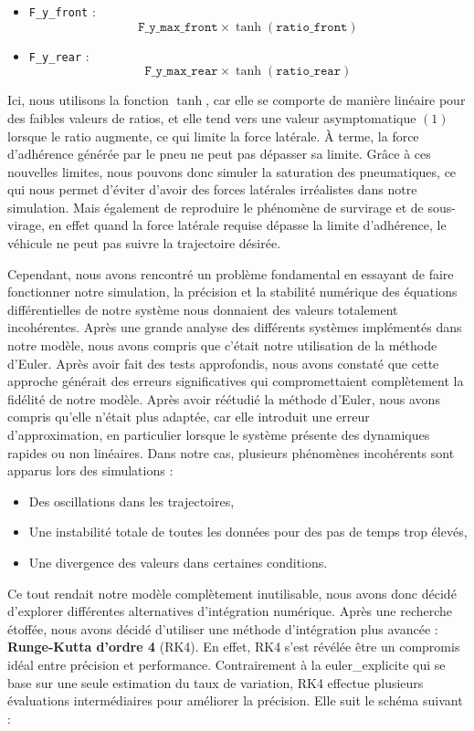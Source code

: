 \begin{itemize}
    \item \texttt{F\_y\_front} : $$\texttt{F\_y\_max\_front} \times \tanh(\texttt{ratio\_front})$$
    \item \texttt{F\_y\_rear} : $$\texttt{F\_y\_max\_rear} \times \tanh(\texttt{ratio\_rear})$$
\end{itemize}

Ici, nous utilisons la fonction $\tanh$, car elle se comporte de manière linéaire pour des faibles valeurs de ratios, et elle tend vers une valeur asymptomatique $(1)$ lorsque le ratio augmente, ce qui limite la force latérale.
À terme, la force d'adhérence générée par le pneu ne peut pas dépasser sa limite.
Grâce à ces nouvelles limites, nous pouvons donc simuler la saturation des pneumatiques, ce qui nous permet d'éviter d'avoir des forces latérales irréalistes dans notre simulation.
Mais également de reproduire le phénomène de survirage et de sous-virage, en effet quand la force latérale requise dépasse la limite d'adhérence, le véhicule ne peut pas suivre la trajectoire désirée.

Cependant, nous avons rencontré un problème fondamental en essayant de faire fonctionner notre simulation, la précision et la stabilité numérique des équations différentielles de notre système nous donnaient des valeurs totalement incohérentes.
Après une grande analyse des différents systèmes implémentés dans notre modèle, nous avons compris que c'était notre utilisation de la méthode d'Euler.
Après avoir fait des tests approfondis, nous avons constaté que cette approche générait des erreurs significatives qui compromettaient complètement la fidélité de notre modèle.
Après avoir réétudié la méthode d'Euler, nous avons compris qu'elle n'était plus adaptée, car elle introduit une erreur d'approximation, en particulier lorsque le système présente des dynamiques rapides ou non linéaires.
Dans notre cas, plusieurs phénomènes incohérents sont apparus lors des simulations :
\begin{itemize}
    \item Des oscillations dans les trajectoires,
    \item Une instabilité totale de toutes les données pour des pas de temps trop élevés,
    \item Une divergence des valeurs dans certaines conditions.
\end{itemize}
Ce tout rendait notre modèle complètement inutilisable, nous avons donc décidé d'explorer différentes alternatives d'intégration numérique.
Après une recherche étoffée, nous avons décidé d'utiliser une méthode d'intégration plus avancée : \textbf{Runge-Kutta d'ordre 4} (RK4).
En effet, RK4 s'est révélée être un compromis idéal entre précision et performance.
Contrairement à la \gls{euler_explicite} qui se base sur une seule estimation du taux de variation, RK4 effectue plusieurs évaluations intermédiaires pour améliorer la précision.
Elle suit le schéma suivant :

